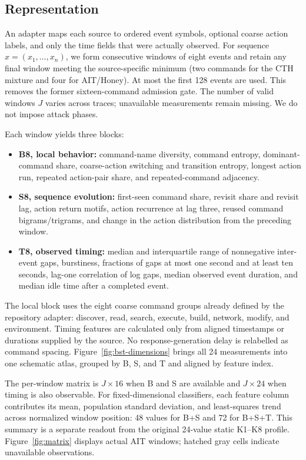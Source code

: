 \documentclass[10pt]{article}
\begin{document}
\subsection{Representation}
An adapter maps each source to ordered event symbols, optional coarse action labels, and only the time fields that were actually observed. For sequence $x=(x_1,\ldots,x_n)$, we form consecutive windows of eight events and retain any final window meeting the source-specific minimum (two commands for the CTH mixture and four for AIT/Honey). At most the first 128 events are used. This removes the former sixteen-command admission gate. The number of valid windows $J$ varies across traces; unavailable measurements remain missing. We do not impose attack phases.

Each window yields three blocks:
\begin{itemize}[leftmargin=1.4em,itemsep=0.1em]
\item \textbf{B8, local behavior:} command-name diversity, command entropy, dominant-command share, coarse-action switching and transition entropy, longest action run, repeated action-pair share, and repeated-command adjacency.
\item \textbf{S8, sequence evolution:} first-seen command share, revisit share and revisit lag, action return motifs, action recurrence at lag three, reused command bigrams/trigrams, and change in the action distribution from the preceding window.
\item \textbf{T8, observed timing:} median and interquartile range of nonnegative inter-event gaps, burstiness, fractions of gaps at most one second and at least ten seconds, lag-one correlation of log gaps, median observed event duration, and median idle time after a completed event.
\end{itemize}
The local block uses the eight coarse command groups already defined by the repository adapter: discover, read, search, execute, build, network, modify, and environment. Timing features are calculated only from aligned timestamps or durations supplied by the source. No response-generation delay is relabelled as command spacing.
Figure~\ref{fig:bst-dimensions} brings all 24 measurements into one schematic atlas, grouped by B, S, and T and aligned by feature index.

The per-window matrix is $J\times16$ when B and S are available and $J\times24$ when timing is also observable. For fixed-dimensional classifiers, each feature column contributes its mean, population standard deviation, and least-squares trend across normalized window position: 48 values for B+S and 72 for B+S+T. This summary is a separate readout from the original 24-value static K1--K8 profile. Figure~\ref{fig:matrix} displays actual AIT windows; hatched gray cells indicate unavailable observations.
\end{document}
